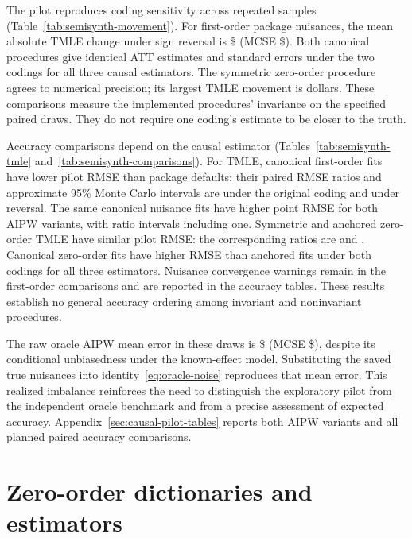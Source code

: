 \documentclass[11pt]{article}
\theoremstyle{definition}
\theoremstyle{remark}
\begin{document}
The pilot reproduces coding sensitivity across repeated samples
(Table~\ref{tab:semisynth-movement}). For first-order package nuisances,
the mean absolute TMLE change under sign reversal is
\$\CausalPilotDefaultMovement{} (MCSE \$\CausalPilotDefaultMovementMCSE{}).
Both canonical procedures give identical ATT estimates and standard errors
under the two codings for all three causal estimators. The symmetric
zero-order procedure agrees to numerical precision; its largest TMLE
movement is \CausalPilotSymmetricMaximum{} dollars. These comparisons
measure the implemented procedures' invariance on the specified paired
draws. They do not require one coding's estimate to be closer to the truth.



Accuracy comparisons depend on the causal estimator
(Tables~\ref{tab:semisynth-tmle} and~\ref{tab:semisynth-comparisons}).
For TMLE, canonical first-order fits have lower pilot RMSE than package
defaults: their paired RMSE ratios and approximate 95\% Monte Carlo
intervals are \CausalPilotFirstOriginal{} under the original coding and
\CausalPilotFirstReversed{} under reversal. The same canonical nuisance
fits have higher point RMSE for both AIPW variants, with ratio intervals
including one. Symmetric and anchored zero-order TMLE have similar pilot
RMSE: the corresponding ratios are \CausalPilotSymOriginal{} and
\CausalPilotSymReversed{}. Canonical zero-order fits have higher RMSE
than anchored fits under both codings for all three estimators.
Nuisance convergence warnings remain in the first-order comparisons and
are reported in the accuracy tables. These results establish no general
accuracy ordering among invariant and noninvariant procedures.



The raw oracle AIPW mean error in these draws is
\$\CausalPilotOracleBias{} (MCSE \$\CausalPilotOracleMCSE{}), despite
its conditional unbiasedness under the known-effect model. Substituting
the saved true nuisances into identity~\eqref{eq:oracle-noise}
reproduces that mean error. This realized imbalance reinforces the need
to distinguish the exploratory pilot from the independent oracle
benchmark and from a precise assessment of expected accuracy.
Appendix~\ref{sec:causal-pilot-tables} reports both AIPW variants and
all planned paired accuracy comparisons.

\section{Zero-order dictionaries and estimators}
\end{document}
